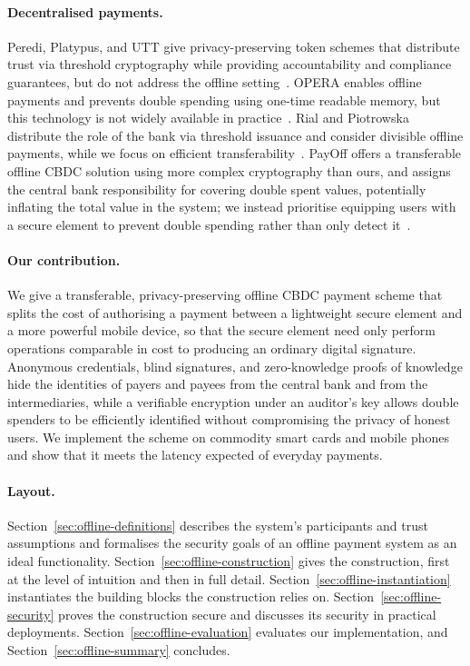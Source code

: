 \paragraph{Decentralised payments.}
Peredi, Platypus, and
UTT give privacy-preserving token schemes that
distribute trust via threshold cryptography while providing accountability
and compliance guarantees, but do not address the offline
setting~\cite{CCS:KiaKohSar22,CCS:WKDC22,EPRINT:TBAAGP22}. OPERA
enables offline payments and prevents double spending using one-time readable
memory, but this technology is not widely available in
practice~\cite{park2017opera}. Rial and Piotrowska distribute the role of the bank via threshold
issuance and consider divisible offline payments, while we
focus on efficient transferability~\cite{PoPETS:RiaPio23}. PayOff offers a
transferable offline CBDC solution using more complex cryptography than ours,
and assigns the central bank responsibility for covering double spent values,
potentially inflating the total value in the system; we instead prioritise
equipping users with a secure element to prevent double spending rather than
only detect it~\cite{Beer2024}.

\paragraph{Our contribution.} We give a transferable, privacy-preserving
offline CBDC payment scheme that splits the cost of authorising a payment
between a lightweight secure element and a more powerful mobile device, so
that the secure element need only perform operations comparable in cost to
producing an ordinary digital signature. Anonymous credentials, blind
signatures, and zero-knowledge proofs of knowledge hide the identities of
payers and payees from the central bank and from the intermediaries, while a
verifiable encryption under an auditor's key allows double spenders to be
efficiently identified without compromising the privacy of honest users. We
implement the scheme on commodity smart cards and mobile phones and show that
it meets the latency expected of everyday payments.

\paragraph{Layout.} Section~\ref{sec:offline-definitions} describes the
system's participants and trust assumptions and formalises the security goals
of an offline payment system as an ideal functionality.
Section~\ref{sec:offline-construction} gives the construction, first at the level of
intuition and then in full detail. Section~\ref{sec:offline-instantiation}
instantiates the building blocks the construction relies on.
Section~\ref{sec:offline-security} proves the construction secure and discusses
its security in practical deployments. Section~\ref{sec:offline-evaluation} evaluates our
implementation, and Section~\ref{sec:offline-summary} concludes.
